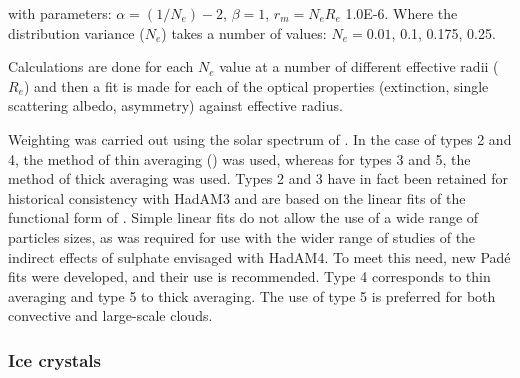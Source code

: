 \smallskip
\noindent with parameters: $\alpha = (1/N_e) - 2$, $\beta = 1$, $r_m = N_e R_e$ 1.0E-6. Where the distribution variance ($N_e$) takes a number of values: $N_e = 0.01$, 0.1, 0.175, 0.25.

Calculations are done for each $N_e$ value at a number of different effective radii ($R_e$) and then a fit is made for each of the optical properties (extinction, single scattering albedo, asymmetry) against effective radius.

Weighting
was carried out using the solar spectrum of \citet{Labs70}. In the case of
types 2 and 4, the method of thin averaging (\citet{Edwards96rc}) was used,
whereas for types 3 and 5, the method of thick averaging was used. 
Types 2 and 3 have in fact been retained for historical consistency with
HadAM3 and are based on the linear fits of the functional form of
\citet{Slingo82}. Simple linear fits do not allow the use of a wide range
of particles sizes, as was required for use with the wider range of
studies of the indirect effects of sulphate envisaged with HadAM4.
To meet this need, new Pad\'e fits were developed, and their use is 
recommended. Type 4 corresponds to thin averaging and type 5 to thick
averaging. The use of type 5 is preferred for both convective and large-scale
clouds.

\subsubsection*{Ice crystals}

